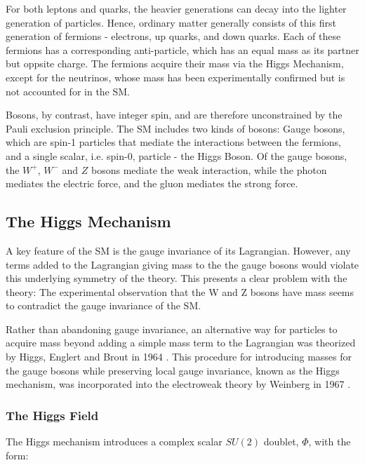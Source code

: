 For both leptons and quarks, the heavier generations can decay into the lighter generation of particles. Hence, ordinary matter generally consists of this first generation of fermions - electrons, up quarks, and down quarks. Each of these fermions has a corresponding anti-particle, which has an equal mass as its partner but oppsite charge. The fermions acquire their mass via the Higgs Mechanism, except for the neutrinos, whose mass has been experimentally confirmed but is not accounted for in the SM. 

Bosons, by contrast, have integer spin, and are therefore unconstrained by the Pauli exclusion principle. The SM includes two kinds of bosons: Gauge bosons, which are spin-1 particles that mediate the interactions between the fermions, and a single scalar, i.e. spin-0, particle - the Higgs Boson. Of the gauge bosons, the $W^+$, $W^-$ and $Z$ bosons mediate the weak interaction, while the photon mediates the electric force, and the gluon mediates the strong force. 


\subsection{The Higgs Mechanism}
\label{sec:higgsMech}

A key feature of the SM is the gauge invariance of its Lagrangian. However, any terms added to the Lagrangian giving mass to the the gauge bosons would violate this underlying symmetry of the theory. This presents a clear problem with the theory: The experimental observation that the W and Z bosons have mass seems to contradict the gauge invariance of the SM. 

Rather than abandoning gauge invariance, an alternative way for particles to acquire mass beyond adding a simple mass term to the Lagrangian was theorized by Higgs, Englert and Brout in 1964 \cite{Higgs}. This procedure for introducing masses for the gauge bosons while preserving local gauge invariance, known as the Higgs mechanism, was incorporated into the electroweak theory by Weinberg in 1967 \cite{PhysRevLett.19.1264}.  

\subsubsection{The Higgs Field}
\label{sec:higgsField}

The Higgs mechanism introduces a complex scalar $SU(2)$ doublet, $\Phi$, with the form:

